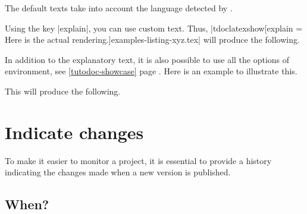 \begin{tdocnote}
    The default texts take into account the language detected by \thisproj.
\end{tdocnote}




\begin{tdocexa}
    Using the key \tdocinlatex|explain|, you can use custom text. Thus, \tdocinlatex|tdoclatexshow[explain = Here is the actual rendering.]{examples-listing-xyz.tex}| will produce the following.

    \medskip

    \begin{tdocshowcaseDOC}

    \end{tdocshowcaseDOC}
\end{tdocexa}




\begin{tdocexa}
    In addition to the explanatory text, it is also possible to use all the options of  environment, see \ref{tutodoc-showcase} page \pageref{tutodoc-showcase}.
    Here is an example to illustrate this.

    \medskip



    \medskip

    This will produce the following.

    \medskip

    \begin{tdocshowcaseDOC}
        

    \end{tdocshowcaseDOC}
\end{tdocexa}


\section{Indicate changes}

To make it easier to monitor a project, it is essential to provide a history indicating the changes made when a new version is published.



\subsection{When?}

